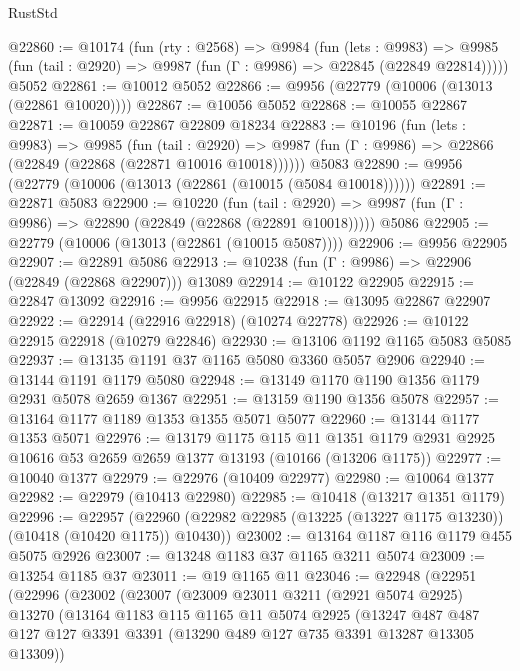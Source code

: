 \begin{lexlean}{RustStd}
\begin{coremodule}
@22860 := @10174
    (fun (rty : @2568) =>
    @9984
      (fun (lets : @9983) =>
      @9985 (fun (tail : @2920) => @9987 (fun (Γ : @9986) => @22845 (@22849 @22814)))))
    @5052
@22861 := @10012 @5052
@22866 := @9956 (@22779 (@10006 (@13013 (@22861 @10020))))
@22867 := @10056 @5052
@22868 := @10055 @22867
@22871 := @10059 @22867 @22809 @18234
@22883 := @10196
    (fun (lets : @9983) =>
    @9985
      (fun (tail : @2920) =>
      @9987 (fun (Γ : @9986) => @22866 (@22849 (@22868 (@22871 @10016 @10018))))))
    @5083
@22890 := @9956 (@22779 (@10006 (@13013 (@22861 (@10015 (@5084 @10018))))))
@22891 := @22871 @5083
@22900 := @10220
    (fun (tail : @2920) => @9987 (fun (Γ : @9986) => @22890 (@22849 (@22868 (@22891 @10018)))))
    @5086
@22905 := @22779 (@10006 (@13013 (@22861 (@10015 @5087))))
@22906 := @9956 @22905
@22907 := @22891 @5086
@22913 := @10238 (fun (Γ : @9986) => @22906 (@22849 (@22868 @22907))) @13089
@22914 := @10122 @22905
@22915 := @22847 @13092
@22916 := @9956 @22915
@22918 := @13095 @22867 @22907
@22922 := @22914 (@22916 @22918) (@10274 @22778)
@22926 := @10122 @22915 @22918 (@10279 @22846)
@22930 := @13106 @1192 @1165 @5083 @5085
@22937 := @13135 @1191 @37 @1165 @5080 @3360 @5057 @2906
@22940 := @13144 @1191 @1179 @5080
@22948 := @13149 @1170 @1190 @1356 @1179 @2931 @5078 @2659 @1367
@22951 := @13159 @1190 @1356 @5078
@22957 := @13164 @1177 @1189 @1353 @1355 @5071 @5077
@22960 := @13144 @1177 @1353 @5071
@22976 := @13179
    @1175
    @115
    @11
    @1351
    @1179
    @2931
    @2925
    @10616
    @53
    @2659
    @2659
    @1377
    @13193
    (@10166 (@13206 @1175))
@22977 := @10040 @1377
@22979 := @22976 (@10409 @22977)
@22980 := @10064 @1377
@22982 := @22979 (@10413 @22980)
@22985 := @10418 (@13217 @1351 @1179)
@22996 := @22957
    (@22960 (@22982 @22985 (@13225 (@13227 @1175 @13230)) (@10418 (@10420 @1175)) @10430))
@23002 := @13164 @1187 @116 @1179 @455 @5075 @2926
@23007 := @13248 @1183 @37 @1165 @3211 @5074
@23009 := @13254 @1185 @37
@23011 := @19 @1165 @11
@23046 := @22948
    (@22951
      (@22996
        (@23002
          (@23007
            (@23009
              @23011
              @3211
              (@2921 @5074 @2925)
              @13270
              (@13164
                @1183
                @115
                @1165
                @11
                @5074
                @2925
                (@13247
                  @487
                  @487
                  @127
                  @127
                  @3391
                  @3391
                  (@13290 @489 @127 @735 @3391 @13287 @13305 @13309))

\end{coremodule}
\end{lexlean}
